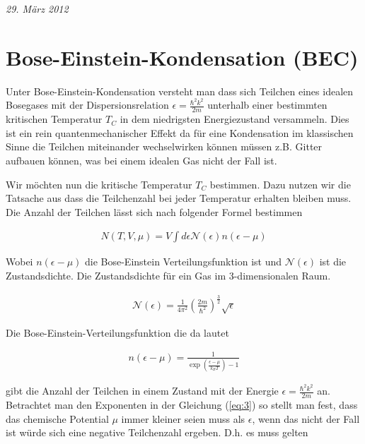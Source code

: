 
\usepackage{amsmath} 





\textit{29. März 2012}


\section*{Bose-Einstein-Kondensation (BEC)}

Unter Bose-Einstein-Kondensation versteht man dass sich Teilchen eines idealen Bosegases mit der Dispersionsrelation \(\epsilon = \frac{\hbar^2 k^2}{2m}\) unterhalb einer bestimmten kritischen Temperatur \(T_C\) in dem niedrigsten Energiezustand versammeln. Dies ist ein rein quantenmechanischer Effekt da für eine Kondensation im klassischen Sinne die Teilchen miteinander wechselwirken können müssen z.B. Gitter aufbauen können, was bei einem idealen Gas nicht der Fall ist.

Wir möchten nun die kritische Temperatur \(T_C\) bestimmen. Dazu nutzen wir die Tatsache aus dass die Teilchenzahl bei jeder Temperatur erhalten bleiben muss. Die Anzahl der Teilchen lässt sich nach folgender Formel bestimmen

\begin{align}
  \label{eq:1}
  N(T,V,\mu) = V\int d\epsilon \mathcal N(\epsilon) n(\epsilon-\mu)
\end{align}

Wobei \( n(\epsilon-\mu) \) die Bose-Einstein Verteilungsfunktion ist und \(\mathcal N(\epsilon)\) ist die Zustandsdichte. Die Zustandsdichte für ein Gas im 3-dimensionalen Raum.

\begin{align}
  \label{eq:2}
  \mathcal N(\epsilon) = \frac{1}{4\pi^2}\left( \frac{2m}{\hbar^2}  \right)^{\frac{3}{2}}\sqrt{\epsilon}
\end{align}

Die Bose-Einstein-Verteilungsfunktion die da lautet

\begin{align}
  \label{eq:3}
  n(\epsilon-\mu) = \frac{1}{\exp\left(\frac{\epsilon-\mu}{k_B T}\right)-1}
\end{align}

gibt die Anzahl der Teilchen in einem Zustand mit der Energie \(\epsilon = \frac{\hbar^2 k^2}{2m}\) an. Betrachtet man den Exponenten in der Gleichung (\ref{eq:3}) so stellt man fest, dass das chemische Potential \(\mu\) immer kleiner seien muss als \(\epsilon\), wenn das nicht der Fall ist würde sich eine negative Teilchenzahl ergeben. D.h. es muss gelten

